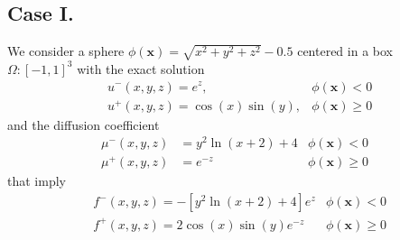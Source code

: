 \documentclass{elsarticle}
\begin{document}
\subsection{Case I.}
We consider a sphere $\phi(\mathbf{x})=\sqrt{x^2 + y^2 + z^2} - 0.5$ centered in a box $\Omega:[-1,1]^3$ with the exact solution
\begin{align*}
& u^-(x,y,z)=e^{z}, & \phi(\mathbf{x})<0\\
& u^+(x,y,z)=\cos(x)\sin(y), & \phi(\mathbf{x})\ge 0
\end{align*}
and the diffusion coefficient
\begin{align*}
\mu^-(x,y,z)&=y^2 \ln(x+2) + 4 &\phi(\mathbf{x})<0 \\
\mu^+(x,y,z)&=e^{-z} &\phi(\mathbf{x})\ge 0 
\end{align*}
that imply
\begin{align*}
&f^-(x,y,z)=-[y^2\ln(x+2) + 4] e^{z} &\phi(\mathbf{x})< 0\\
&f^+(x,y,z)=2\cos(x)\sin(y)e^{-z} &\phi(\mathbf{x})\ge 0
\end{align*}
\end{document}
